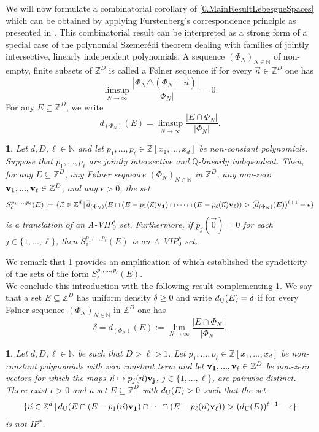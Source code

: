 \documentclass[11pt,american,preprint]{elsarticle}
\numberwithin{equation}{section}
\theoremstyle{plain}
\theoremstyle{plain*}
\theoremstyle{plain}
\theoremstyle{plain*}
\theoremstyle{plain}
\theoremstyle{plain*}
\theoremstyle{remark}
\theoremstyle{remark*}
\theoremstyle{remark}
\theoremstyle{remark*}
\theoremstyle{remark}
\theoremstyle{remark*}
\theoremstyle{plain}
\newtheorem{cor}[thm]{\protect\corollaryname}
\providecommand{\corollaryname}{Corollary}
\theoremstyle{definition}
\theoremstyle{plain}
\theoremstyle{plain} %
\newcommand{\N}{\mathbb{N}}
\newcommand{\Q}{\mathbb{Q}}
\newcommand{\Z}{\mathbb{Z}}
\begin{document}
We will now formulate  a combinatorial corollary of \cref{0.MainResultLebesgueSpaces} which can be  obtained by applying Furstenberg's correspondence principle  as presented  in \cite[Theorem 6.4.17]{bergelson2000DiophantineSurvey}. This combinatorial  result can be interpreted as a strong form of a special case of the polynomial Szemer{\'e}di theorem \cite{bergelsonLeibmaPolyVderWardenAndSz} dealing with families of jointly intersective, linearly independent polynomials.  
A sequence $(\Phi_N)_{N\in\N}$ of non-empty, finite subsets of $\Z^D$ is called a F{\o}lner sequence if for every $\vec n\in\Z^D$ one has 
$$
\limsup_{N\rightarrow\infty} \frac{|\Phi_N\triangle(\Phi_N-\vec n)|}{|\Phi_N|}=0.
$$
For any $E\subseteq \Z^D$, we write
$$
\overline d_{(\Phi_N)}(E)=\limsup_{N\rightarrow\infty} \frac{|E\cap \Phi_N|}{|\Phi_N|}.
$$
\begin{cor}\label{0.CombinatorialApplication}
    Let $d,D,\ell\in\N$ and let $p_1,...,p_\ell\in\Z[x_1,...,x_d]$ be non-constant polynomials. Suppose that $p_1,...,p_\ell$ are jointly intersective and $\Q$-linearly independent. Then, for any $E\subseteq \Z^D$, any F{\o}lner sequence $(\Phi_N)_{N\in\N}$ in $\Z^D$, any non-zero ${\bf v_1},...,{\bf v_\ell}\in\Z^D$, and any $\epsilon>0$, the set 
    $$
S_\epsilon^{p_1,...,p_\ell}(E):=\{\vec n\in\Z^d\,|\,\overline d_{(\Phi_N)}(E\cap (E-p_1(\vec n){\bf v_1})\cap \cdots\cap (E-p_\ell(\vec n){\bf v_\ell}))>(\overline d_{(\Phi_N)}(E))^{\ell+1}-\epsilon\}
    $$
is a translation of an A-\rm{VIP$_0^*$} set. Furthermore, if $p_j(\vec 0)=0$ for each $j\in\{1,...,\ell\}$, then $S_\epsilon^{p_1,...,p_\ell}(E)$ is an A-\rm{VIP$_0^*$} set. 
\end{cor}
We remark that 
\cref{0.CombinatorialApplication} provides an amplification of \cite[Corollary 2.12]{FraKuJoinErgForIndependentPolys} which established the syndeticity of the sets of the form $S_\epsilon^{p_1,...,p_\ell}(E)$.\\
We conclude this introduction with the following result  complementing \cref{0.CombinatorialApplication}. We say that a  set $E\subseteq \Z^D$ has uniform density $\delta\geq 0$  and write $d_{{\rm U}}(E)=\delta$ if for every F{\o}lner sequence $(\Phi_N)_{N\in\N}$ in $\Z^D$ one has
 $$\delta=d_{(\Phi_N)}(E):=\lim_{N\rightarrow\infty}\frac{|E\cap \Phi_N|}{|\Phi_N|}.$$
\begin{cor}\label{0.Cor:CombinatorialFailureOfIP}
    Let $d,D,\ell\in\N$  be such that $D>\ell>1$. Let $p_1,...,p_\ell\in\Z[x_1,...,x_d]$ be  non-constant polynomials with zero constant term and 
    let ${\bf v_1},...,{\bf v_\ell}\in\Z^D$ be non-zero vectors for which  the  maps $\vec n\mapsto p_j(\vec n){\bf v_j}$, $j\in\{1,...,\ell\}$, are pairwise distinct.
    There exist $\epsilon>0$ and a set $E\subseteq \Z^D$ with $d_{{\rm U}}(E)>0$ such that the set 
    \begin{equation}\label{0.eq:InverseFurstenberg}
\{\vec n\in\Z^d\,|\,d_{{\rm U}}(E\cap (E-p_1(\vec n){\bf v_1})\cap\cdots\cap (E-p_\ell(\vec n){\bf v_\ell}))>(d_{{\rm U}}(E))^{\ell+1}-\epsilon\}
    \end{equation}
    is not {\rm IP$^*$}.  
\end{cor}
\end{document}
